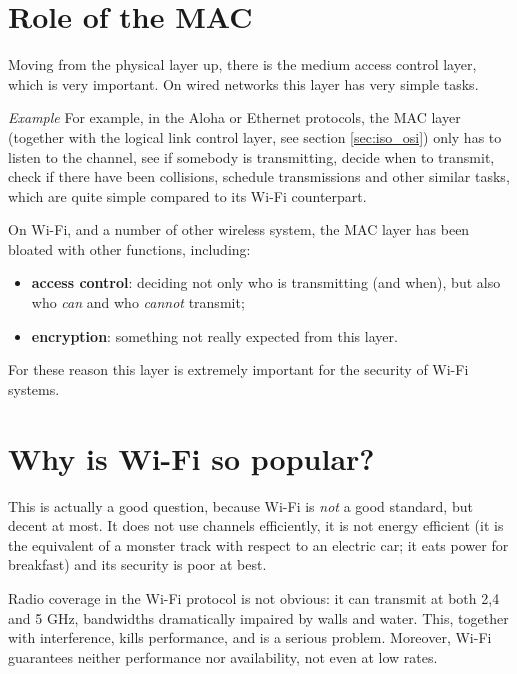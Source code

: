 
\section{Role of the MAC}
Moving from the physical layer up, there is the medium access control layer, which is very important. On wired networks this layer has very simple tasks.

\vspace{0.5em}

\emph{Example} For example, in the Aloha or Ethernet protocols, the MAC layer (together with the logical link control layer, see section \ref{sec:iso_osi}) only has to listen to the channel, see if somebody is transmitting, decide when to transmit, check if there have been collisions, schedule transmissions and other similar tasks, which are quite simple compared to its Wi-Fi counterpart.

\vspace{0.5em}

On Wi-Fi, and a number of other wireless system, the MAC layer has been bloated with other functions, including:

\begin{itemize}
    \item \textbf{access control}: deciding not only who is transmitting (and when), but also who \textit{can} and who \textit{cannot} transmit;
    \item \textbf{encryption}: something not really expected from this layer.
\end{itemize}

For these reason this layer is extremely important for the security of Wi-Fi systems.


\section{Why is Wi-Fi so popular?}
This is actually a good question, because Wi-Fi is \textit{not} a good standard, but decent at most. It does not use channels efficiently, it is not energy efficient (it is the equivalent of a monster track with respect to an electric car; it eats power for breakfast) and its security is poor at best.

Radio coverage in the Wi-Fi protocol is not obvious: it can transmit at both 2,4 and 5 GHz, bandwidths dramatically impaired by walls and water. This, together with interference, kills performance, and is a serious problem. Moreover, Wi-Fi guarantees neither performance nor availability, not even at low rates.

